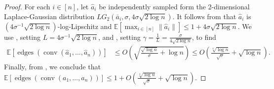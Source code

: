 \documentclass{theoretics}
\newcommand{\E}{\mathbb E}
\newcommand{\conv}{\operatorname{conv}}
\newcommand{\edges}{\operatorname{edges}}
\begin{document}
\begin{proof}
    For each $i \in [n]$, let $\hat{a}_i$ be independently sampled form the 2-dimensional Laplace-Gaussian distribution $LG_2(\bar{a}_i, \sigma, 4\sigma \sqrt{2\log n})$. It follows from
     that
    $\hat{a}_i$ is $(4\sigma^{-1} \sqrt{2\log n})$-log-Lipschitz
    and $\E[\max_{i \in [n]}\|\hat a_i\|] \leq 1 + 4\sigma\sqrt{2\log n}$.
    We use , setting $L = 4\sigma^{-1} \sqrt{2\log n}$, and
    , setting $\gamma = \frac{1}{L} = \frac{\sigma}{4\sqrt{2\log n}}$, to find
    \begin{align*}
        \E\left[ \edges\left(\conv(\hat{a}_1, \ldots, \hat{a}_n) \right) \right] 
         &\leq O\left(\sqrt{\frac{\sqrt{\log n}}{\sigma} + \log n}\right) \leq  O\left(\frac{\sqrt[4]{\log n}}{\sqrt{\sigma}} + \sqrt{\log n}\right).
    \end{align*}
    Finally, from , we conclude that $
        \E\left[ \edges\left(\conv(a_1, \ldots, a_n) \right) \right] \leq 1 + O(\frac{\sqrt[4]{\log n}}{\sqrt{\sigma}} + \sqrt{\log n}).
    $
\end{proof}
\end{document}
